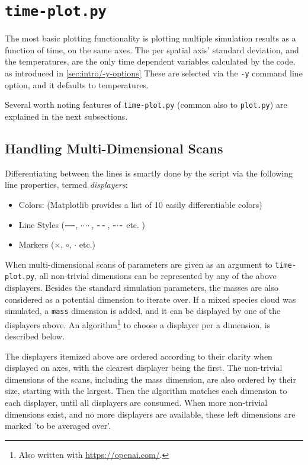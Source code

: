 \section{\texttt{time-plot.py}}

The most basic plotting functionality is plotting multiple simulation results as a function of time, on the same axes. The per spatial axis' standard deviation, and the temperatures, are the only time dependent variables calculated by the code, as introduced in \ref{sec:intro/-y-options} These are selected via the \texttt{-y} command line option, and it defaults to temperatures.

Several worth noting features of \texttt{time-plot.py} (common also to \texttt{plot.py}) are explained in the next subsections.

\subsection{Handling Multi-Dimensional Scans}

Differentiating between the lines is smartly done by the script via the following line properties, termed \textit{displayers}:

\begin{itemize}
	\item Colors: (Matplotlib provides a list of 10 easily differentiable colors)
	\item Line Styles ($\tikz[baseline=-0.5ex]\draw[thick] (0,0) -- (0.4,0);$, $\tikz[baseline=-0.5ex]\draw[thick, dotted] (0,0) -- (0.4,0);$, $\tikz[baseline=-0.5ex]\draw[thick, dashed] (0,0) -- (0.4,0);$, $\tikz[baseline=-0.5ex]\draw[thick, dash dot] (0,0) -- (0.4,0);$ etc.
)
	\item Markers ($\times$, $\circ$, $\cdot$ etc.)
\end{itemize}

When multi-dimensional scans of parameters are given as an argument to \texttt{time-plot.py}, all non-trivial dimensions can be represented by any of the above displayers. Besides the standard simulation parameters, the masses are also considered as a potential dimension to iterate over. If a mixed species cloud was simulated, a \texttt{mass} dimension is added, and it can be displayed by one of the displayers above. An algorithm\footnote{Also written with \url{https://openai.com/}.} to choose a displayer per a dimension, is described below.

The displayers itemized above are ordered according to their clarity when displayed on axes, with the clearest displayer being the first. The non-trivial dimensions of the scans, including the mass dimension, are also ordered by their size, starting with the largest. Then the algorithm matches each dimension to each displayer, until all displayers are consumed. When more non-trivial dimensions exist, and no more displayers are available, these left dimensions are marked 'to be averaged over'.

